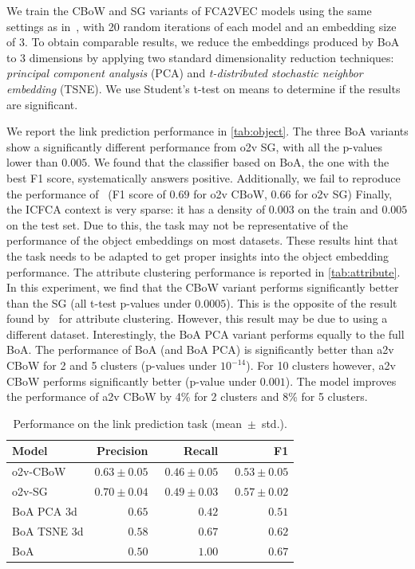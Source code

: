 We train the CBoW and SG variants of FCA2VEC models using the same settings as in~\cite{fca2vec:2019:durrschnabel}, with 20 random iterations of each model and an embedding size of 3.
To obtain comparable results, we reduce the embeddings produced by BoA to 3 dimensions by applying two standard dimensionality reduction techniques:
\textit{principal component analysis} (PCA) and \textit{t-distributed stochastic neighbor embedding} (TSNE).
We use Student's t-test on means to determine if the results are significant.

We report the link prediction performance in \autoref{tab:object}.
The three BoA variants show a significantly different performance from o2v SG, with all the p-values lower than $0.005$.
%
We found that the classifier based on BoA, the one with the best F1 score, systematically answers positive.
Additionally, we fail to reproduce the performance of~\cite{fca2vec:2019:durrschnabel} (F1 score of $0.69$ for o2v CBoW, $0.66$ for o2v SG)
Finally, the ICFCA context is very sparse: it has a density of $0.003$ on the train and $0.005$ on the test set.
Due to this, the task may not be representative of the performance of the object embeddings on most datasets.
%
These results hint that the task needs to be adapted to get proper insights into the object embedding performance.
%
%
The attribute clustering performance is reported in \autoref{tab:attribute}.
In this experiment, we find that the CBoW variant performs significantly better than the SG (all t-test p-values under $0.0005$).
This is the opposite of the result found by~\cite{fca2vec:2019:durrschnabel} for attribute clustering.
However, this result may be due to using a different dataset.
Interestingly, the BoA PCA variant performs equally to the full BoA.
The performance of BoA (and BoA PCA) is significantly better than a2v CBoW for 2 and 5 clusters (p-values under $10^{-14}$).
For 10 clusters however, a2v CBoW performs significantly better (p-value under $0.001$).
%
The model improves the performance of a2v CBoW by 4\% for 2 clusters and 8\% for 5 clusters.




\begin{table}[t]
\caption{Performance on the link prediction task (mean~$\pm$~std.).}\label{tab:object}
\centering
\begin{tabular}{lrrr}
\toprule
Model &  Precision & Recall & F1 \\
\midrule
o2v-CBoW    &  $0.63 \pm 0.05$ & ~$0.46 \pm 0.05$ & ~$0.53 \pm 0.05$ \\
o2v-SG      &  $0.70 \pm 0.04$ & $0.49 \pm 0.03$ & $0.57 \pm 0.02$ \\
\midrule
BoA PCA 3d  &  $0.65$ & $0.42$ & $0.51$ \\
BoA TSNE 3d &  $0.58$ & $0.67$ & ${0.62}$ \\
BoA         &  $0.50$ & $1.00$ & ${0.67}$ \\
\bottomrule
\end{tabular}
\end{table}


